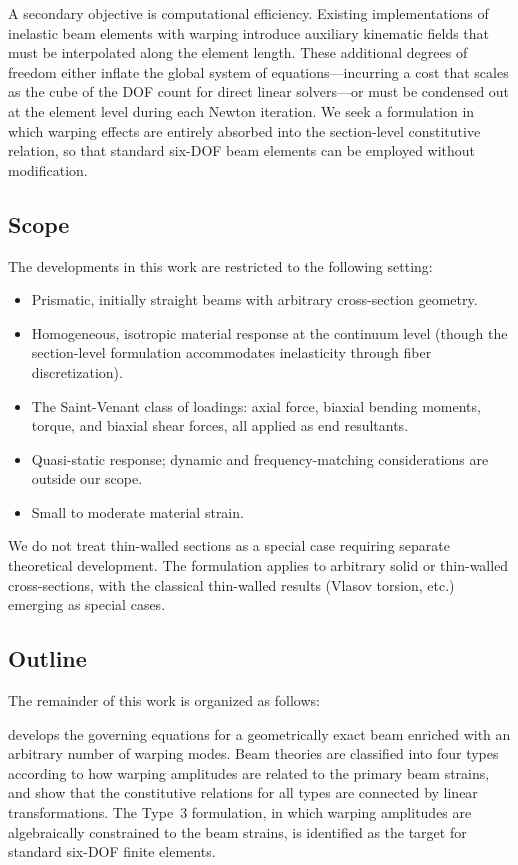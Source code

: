 A secondary objective is computational efficiency. Existing implementations 
of inelastic beam elements with warping \citep{saritas2009inelastic,%
lecorvec2012nonlinear,dire2018mixed} introduce auxiliary kinematic fields 
that must be interpolated along the element length. These additional degrees 
of freedom either inflate the global system of equations—incurring a cost 
that scales as the cube of the DOF count for direct linear solvers—or must 
be condensed out at the element level during each Newton iteration. We seek 
a formulation in which warping effects are entirely absorbed into the 
section-level constitutive relation, so that standard six-DOF beam elements 
can be employed without modification.

\subsection{Scope}

The developments in this work are restricted to the following setting:
\begin{itemize}
\item Prismatic, initially straight beams with arbitrary cross-section geometry.
\item Homogeneous, isotropic material response at the continuum level 
      (though the section-level formulation accommodates inelasticity 
      through fiber discretization).
\item The Saint-Venant class of loadings: axial force, biaxial bending moments, 
      torque, and biaxial shear forces, all applied as end resultants.
\item Quasi-static response; dynamic and frequency-matching considerations 
      are outside our scope.
\item Small to moderate material strain.
\end{itemize}

We do not treat thin-walled sections as a special case requiring separate 
theoretical development. The formulation applies to arbitrary solid or 
thin-walled cross-sections, with the classical thin-walled results 
(Vlasov torsion, etc.) emerging as special cases.

\subsection{Outline}

The remainder of this work is organized as follows:

 develops the governing equations for a geometrically exact 
beam enriched with an arbitrary number of warping modes. 
Beam theories are classified into four types according to how warping amplitudes are related to the primary beam strains, and show that the constitutive relations for all types are connected by linear transformations. 
The Type~3 formulation, in which warping amplitudes are algebraically constrained to the beam strains, 
is identified as the target for standard six-DOF finite elements.

